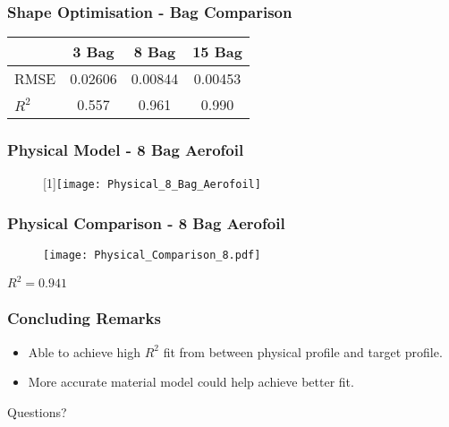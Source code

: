 \documentclass[serif, pdf]{beamer}
\begin{document}

\begin{frame}
\frametitle{Shape Optimisation -  Bag Comparison}
\begin{table}[H]
\makegapedcells
\begin{center}
 \begin{tabular}{lccc} 
 \hline
  & 3 Bag & 8 Bag & 15 Bag \\
 \hline \hline
 RMSE & 0.02606 & 0.00844 & 0.00453\\ 
 $R^2$ & 0.557 & 0.961 & 0.990 \\
 \hline
\end{tabular}
\end{center}
\end{table}
\end{frame}


\begin{frame}
\frametitle{Physical Model - 8 Bag Aerofoil}
\begin{figure}[h!]
  \scalebox{-1}[1]{\texttt{[image: Physical\_8\_Bag\_Aerofoil]}}
\end{figure}
\end{frame}


\begin{frame}
\frametitle{Physical Comparison - 8 Bag Aerofoil}
\begin{figure}[h!]
  \texttt{[image: Physical\_Comparison\_8.pdf]}
\end{figure}
\begin{center}
$R^2 = 0.941$
\end{center}
\end{frame}


\begin{frame}
\frametitle{Concluding Remarks}
\begin{itemize}
\item Able to achieve high $R^2$ fit from between physical profile and target profile.
\item More accurate material model could help achieve better fit. 
\end{itemize}
\end{frame}



\begin{frame}
\begin{center}
\huge Questions?
\end{center}
\end{frame}
\end{document}
